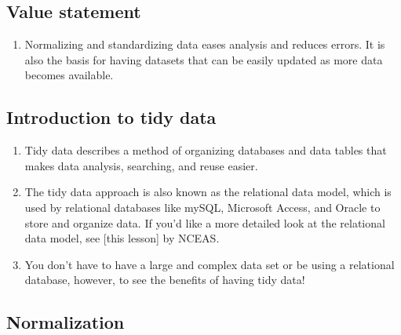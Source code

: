 \documentclass[
]{book}
\providecommand{\tightlist}{%
  \setlength{\itemsep}{0pt}\setlength{\parskip}{0pt}}
\begin{document}
\hypertarget{value-statement-1}{%
\subsection{Value statement}\label{value-statement-1}}

\begin{enumerate}
\def\labelenumi{\arabic{enumi}.}
\tightlist
\item
  Normalizing and standardizing data eases analysis and reduces errors. It is also the basis for having datasets that can be easily updated as more data becomes available.
\end{enumerate}

\hypertarget{introduction-to-tidy-data}{%
\subsection{Introduction to tidy data}\label{introduction-to-tidy-data}}

\begin{enumerate}
\def\labelenumi{\arabic{enumi}.}
\item
  Tidy data describes a method of organizing databases and data tables that makes data analysis, searching, and reuse easier.
\item
  The tidy data approach is also known as the relational data model, which is used by relational databases like mySQL, Microsoft Access, and Oracle to store and organize data. If you'd like a more detailed look at the relational data model, see {[}this lesson{]} by NCEAS.
\item
  You don't have to have a large and complex data set or be using a relational database, however, to see the benefits of having tidy data!
\end{enumerate}

\hypertarget{normalization}{%
\subsection{Normalization}\label{normalization}}
\end{document}
